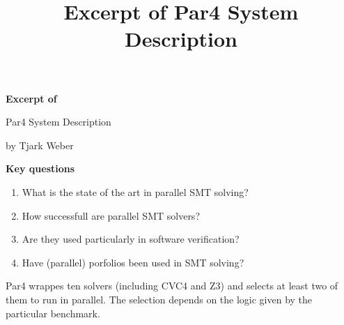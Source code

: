 \documentclass{scrartcl}
\title{Excerpt of Par4 System Description}
\begin{document}
\begin{center}
    \Large{\textbf{Excerpt of}}

    \LARGE{Par4 System Description}

    \large{by Tjark Weber}
\end{center}

\vspace{1cm}

\begin{addmargin}[0.2\linewidth]{0.2\linewidth}
    \begin{center}
        \textbf{Key questions}
    \end{center}
    \begin{enumerate}[i]
        \item What is the state of the art in parallel SMT solving?
        \item How successfull are parallel SMT solvers?
        \item Are they used particularly in software verification?
        \item Have (parallel) porfolios been used in SMT solving?
    \end{enumerate}
\end{addmargin}

\vspace{1cm}

Par4 wrappes ten solvers (including CVC4 and Z3)
and selects at least two of them to run in parallel.
The selection depends on the logic given by the particular benchmark.
\end{document}
